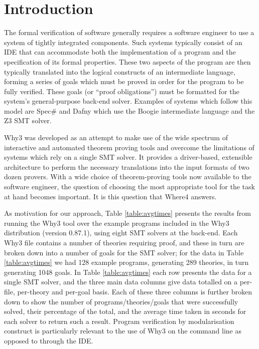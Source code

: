 \documentclass[runningheads,a4paper]{llncs}
\begin{document}
\section{Introduction}

\label{sec:intro}

The formal verification of software generally requires a software engineer to use a system of tightly integrated components. Such systems typically consist of an IDE that can accommodate both the implementation of a program and the specification of its formal properties. 
These two aspects of the program are then typically translated into the logical constructs of an intermediate language, forming a series of goals which must be proved in order for the program to be fully verified. These goals (or ``proof obligations'') must be formatted for the system's general-purpose back-end solver. Examples of systems which follow this model are Spec\# \cite{spec} and Dafny \cite{Dafny} which use the Boogie \cite{Boogie} intermediate language and the Z3 \cite{Z3} SMT solver. 

\textsf{\textsf{Why3}} \cite{why:shephard} was developed as an attempt to make use of the wide spectrum of interactive and automated theorem proving tools and overcome the limitations of systems which rely on a single SMT solver. It provides a driver-based, extensible architecture to perform the necessary translations into the input formats of two dozen provers. With a wide choice of theorem-proving tools now available to the software engineer, the question of choosing the most appropriate tool for the task at hand becomes important. It is this question that \textsf{Where4} answers.

As motivation for our approach, Table \ref{table:avgtimes} presents the results from running the \textsf{Why3} tool over the example programs included in the \textsf{Why3} distribution (version 0.87.1), using eight SMT solvers at the back-end.  
Each \textsf{Why3} file contains a number of theories requiring proof, and these in turn are  broken down into a number of goals for the SMT solver; for the data in Table \ref{table:avgtimes} we had 128 example programs, generating 289 theories, in turn generating 1048 goals.  In Table \ref{table:avgtimes} each row presents the data for a single SMT solver, and the three main data columns give data totalled on a per-file, per-theory and per-goal basis. Each of these three columns is further broken down to show the number of programs/theories/goals that were successfully solved, their percentage of the total, and the average time taken in seconds for each solver to return such a result. Program verification by modularisation construct is particularly relevant to the use of \textsf{Why3} on the command line as opposed to through the IDE.
\end{document}
